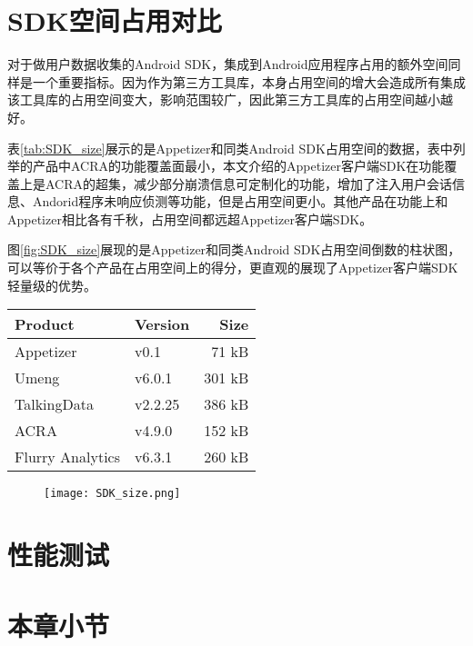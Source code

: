 \section{SDK空间占用对比}

对于做用户数据收集的Android SDK，集成到Android应用程序占用的额外空间同样是一个重要指标。因为作为第三方工具库，本身占用空间的增大会造成所有集成该工具库的占用空间变大，影响范围较广，因此第三方工具库的占用空间越小越好。

表\ref{tab:SDK_size}展示的是Appetizer和同类Android SDK占用空间的数据，表中列举的产品中ACRA的功能覆盖面最小，本文介绍的Appetizer客户端SDK在功能覆盖上是ACRA的超集，减少部分崩溃信息可定制化的功能，增加了注入用户会话信息、Andorid程序未响应侦测等功能，但是占用空间更小。其他产品在功能上和Appetizer相比各有千秋，占用空间都远超Appetizer客户端SDK。

图\ref{fig:SDK_size}展现的是Appetizer和同类Android SDK占用空间倒数的柱状图，可以等价于各个产品在占用空间上的得分，更直观的展现了Appetizer客户端SDK轻量级的优势。

\begin{table}[!hpb]
	\centering
	\begin{tabular}{@{}llr@{}} \toprule
		Product & Version &Size \\ \midrule
		Appetizer &v0.1& 71 kB \\
		Umeng&v6.0.1& 301 kB \\
		TalkingData&v2.2.25& 386 kB \\
		ACRA&v4.9.0& 152 kB \\
		Flurry Analytics&v6.3.1& 260 kB \\ \bottomrule
	\end{tabular}
\end{table}

\begin{figure}[!htp]
	\centering
	\texttt{[image: SDK\_size.png]}
\end{figure}

\section{性能测试}





\section{本章小节}

